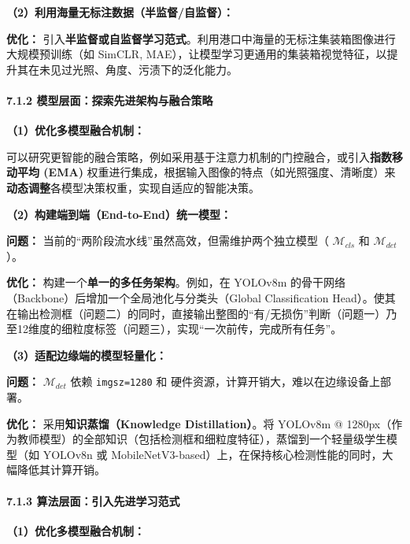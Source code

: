 \documentclass[
]{article}
\begin{document}
\textbf{（2）利用海量无标注数据（半监督/自监督）：}

\textbf{优化：}
引入\textbf{半监督或自监督学习范式}。利用港口中海量的无标注集装箱图像进行大规模预训练（如
SimCLR,
MAE），让模型学习更通用的集装箱视觉特征，以提升其在未见过光照、角度、污渍下的泛化能力。

\paragraph{\texorpdfstring{\textbf{7.1.2
模型层面：探索先进架构与融合策略}}{7.1.2 模型层面：探索先进架构与融合策略}}\label{712-ux6a21ux578bux5c42ux9762ux63a2ux7d22ux5148ux8fdbux67b6ux6784ux4e0eux878dux5408ux7b56ux7565}

\textbf{（1）优化多模型融合机制：}

可以研究更智能的融合策略，例如采用基于注意力机制的门控融合，或引入\textbf{指数移动平均
(EMA)}
权重进行集成，根据输入图像的特点（如光照强度、清晰度）来\textbf{动态调整}各模型决策权重，实现自适应的智能决策。

\textbf{（2）构建端到端（End-to-End）统一模型：}

\textbf{问题：} 当前的``两阶段流水线''虽然高效，但需维护两个独立模型（
\(\mathcal{M}_{cls}\) 和 \(\mathcal{M}_{det}\)）。

\textbf{优化：} 构建一个\textbf{单一的多任务架构}。例如，在 YOLOv8m
的骨干网络（Backbone）后增加一个全局池化与分类头（Global Classification
Head）。使其在输出检测框（问题二）的同时，直接输出整图的``有/无损伤''判断（问题一）乃至12维度的细粒度标签（问题三），实现``一次前传，完成所有任务''。

\textbf{（3）适配边缘端的模型轻量化：}

\textbf{问题：} \(\mathcal{M}_{det}\) 依赖 \texttt{imgsz=1280} 和
硬件资源，计算开销大，难以在边缘设备上部署。

\textbf{优化：} 采用\textbf{知识蒸馏（Knowledge Distillation）}。将
YOLOv8m @
1280px（作为教师模型）的全部知识（包括检测框和细粒度特征），蒸馏到一个轻量级学生模型（如
YOLOv8n 或
MobileNetV3-based）上，在保持核心检测性能的同时，大幅降低其计算开销。

\paragraph{\texorpdfstring{\textbf{7.1.3
算法层面：引入先进学习范式}}{7.1.3 算法层面：引入先进学习范式}}\label{713-ux7b97ux6cd5ux5c42ux9762ux5f15ux5165ux5148ux8fdbux5b66ux4e60ux8303ux5f0f}

\textbf{（1）优化多模型融合机制：}
\end{document}
